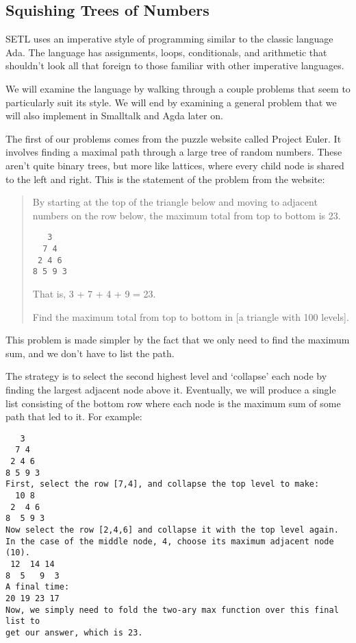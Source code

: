 \documentclass[11pt]{article}
\begin{document}
\subsection{Squishing Trees of Numbers}

SETL uses an imperative style of programming similar to the classic language
Ada. The language has assignments, loops, conditionals, and arithmetic that
shouldn't look all that foreign to those familiar with other imperative
languages. 

We will examine the language by walking through a couple problems that seem
to particularly suit its style. We will end by examining a general problem
that we will also implement in Smalltalk and Agda later on. 

The first of our problems comes from the puzzle website called Project
Euler. It involves finding a maximal path through a large tree of random
numbers. These aren't quite binary trees, but more like lattices, where every
child node is shared to the left and right. This is the statement of the problem
from the website:

\begin{quote}
By starting at the top of the triangle below and moving to adjacent numbers on
the row below, the maximum total from top to bottom is 23.

\begin{verbatim}
   3
  7 4
 2 4 6
8 5 9 3
\end{verbatim}

That is, 3 + 7 + 4 + 9 = 23.

Find the maximum total from top to bottom in [a triangle with 100 levels].
\end{quote}

This problem is made simpler by the fact that we only need to find the maximum
sum, and we don't have to list the path. 

The strategy is to select the second highest level and `collapse' each node by
finding the largest adjacent node above it. Eventually, we will produce a
single list consisting of the bottom row where each node is the maximum sum of
some path that led to it. For example:

\begin{verbatim}
   3
  7 4
 2 4 6
8 5 9 3
First, select the row [7,4], and collapse the top level to make:
  10 8 
 2  4 6
8  5 9 3
Now select the row [2,4,6] and collapse it with the top level again. 
In the case of the middle node, 4, choose its maximum adjacent node (10).
 12  14 14 
8  5   9  3
A final time:
20 19 23 17
Now, we simply need to fold the two-ary max function over this final list to
get our answer, which is 23.
\end{verbatim}
\end{document}
